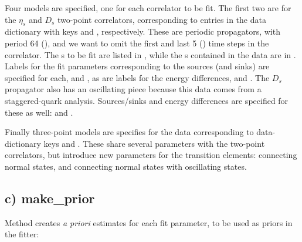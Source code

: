 \documentclass[letterpaper,10pt,english]{sphinxmanual}
\begin{document}
Four models are specified, one for each correlator to be fit. The first two
are for the $\eta_s$ and $D_s$ two-point correlators, corresponding to
entries in the data dictionary with keys  and ,
respectively. These are periodic propagators, with period 64 (), and we want to
omit the first and last 5 () time steps in the correlator. The
s to be fit are listed in , while the s contained in the
data are in . Labels for the fit parameters corresponding to the
sources (and sinks) are specified for each,  and , as
are labels for the energy differences,  and .  The
$D_s$ propagator also has an oscillating piece because this data comes from
a staggered-quark analysis. Sources/sinks and energy differences are
specified for these as well:  and .

Finally three-point models are specifies for the data corresponding to
data-dictionary keys  and . These share several
parameters with the two-point correlators, but introduce new parameters
for the transition elements:  connecting normal states, and
 connecting normal states with oscillating states.


\subsection{c) make\_prior}
\label{corrfitter:id5}
Method  creates \emph{a priori} estimates for each fit
parameter, to be used as priors in the fitter:
\end{document}
